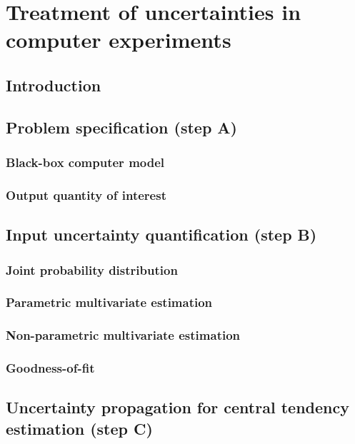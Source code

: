 \chapter{Treatment of uncertainties in computer experiments}
    \section{Introduction}
    \section{Problem specification (step A)}
        \subsection{Black-box computer model}
        \subsection{Output quantity of interest}
    \section{Input uncertainty quantification (step B)}
        \subsection{Joint probability distribution }
        \subsection{Parametric multivariate estimation}
        \subsection{Non-parametric multivariate estimation}
        \subsection{Goodness-of-fit}
    \section{Uncertainty propagation for central tendency estimation (step C)}
